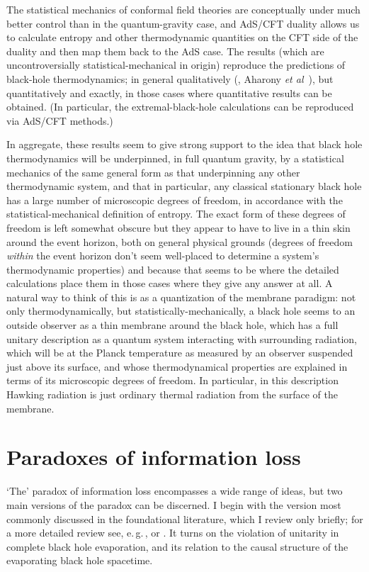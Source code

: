 \documentclass{article}
\newcommand{\egc}{\mbox{e.\,g.\,}}
\begin{document}
The statistical mechanics of conformal field theories are conceptually under much better control than in the quantum-gravity case, and AdS/CFT duality allows us to calculate entropy and other thermodynamic quantities on the CFT side of the duality and then map them back to the AdS case. The results (which are uncontroversially statistical-mechanical in origin) reproduce the predictions of black-hole thermodynamics; in general qualitatively (, Aharony \emph{et al}~), but quantitatively and exactly, in those cases where quantitative results can be obtained. (In particular, the extremal-black-hole calculations can be reproduced \cite{stromingerconformal} via AdS/CFT methods.)

In aggregate, these results seem to give strong support to the idea that black hole thermodynamics will be underpinned, in full quantum gravity, by a statistical mechanics of the same general form as that underpinning any other thermodynamic system, and that in particular, any classical stationary black hole  has a large number of microscopic degrees of freedom, in accordance with the statistical-mechanical definition of entropy. The exact form of these degrees of freedom is left somewhat obscure but they appear to have to live in a thin skin around the event horizon, both on general physical grounds (degrees of freedom \emph{within} the event horizon don't seem well-placed to determine a system's thermodynamic properties) and because that seems to be where the detailed calculations place them in those cases where they give any answer at all. A natural way to think of this is as a quantization of the membrane paradigm: not only thermodynamically, but statistically-mechanically, a black hole seems to an outside observer as a thin membrane around the black hole, which has a full unitary description as a quantum system interacting with surrounding radiation, which will be at the Planck temperature as measured by an observer suspended just above its surface, and whose thermodynamical properties are explained in terms of its microscopic degrees of freedom. In particular, in this description Hawking radiation is just ordinary thermal radiation from the surface of the membrane. 

\section{Paradoxes of information loss}\label{paradoxes}

`The' paradox of information loss encompasses a wide range of ideas, but two main versions of the paradox can be discerned. I begin with the version most commonly discussed in the foundational literature, which I review only briefly; for a more detailed review see, \egc,  or . It turns on the violation of unitarity in complete black hole evaporation, and its relation to the causal structure of the evaporating black hole spacetime.
\end{document}
